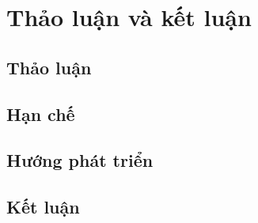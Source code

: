 \section{Thảo luận và kết luận}
\label{sec:conclusion}

\subsection{Thảo luận}
\subsection{Hạn chế}
\subsection{Hướng phát triển}
\subsection{Kết luận}
